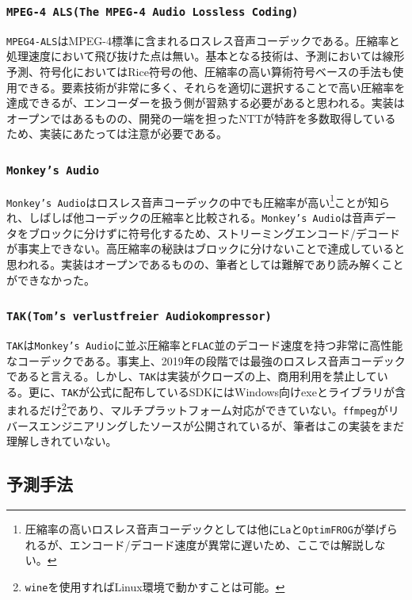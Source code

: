 \documentclass[uplatex,dvipdfmx,b5j,10pt]{jsbook}
\theoremstyle{definition}
\begin{document}
\subsubsection{\texttt{MPEG-4 ALS(The MPEG-4 Audio Lossless Coding)}}
\texttt{MPEG4-ALS}\cite{mpeg4als}はMPEG-4標準に含まれるロスレス音声コーデックである。圧縮率と処理速度において飛び抜けた点は無い。基本となる技術は、予測においては線形予測、符号化においてはRice符号の他、圧縮率の高い算術符号ベースの手法も使用できる。要素技術が非常に多く、それらを適切に選択することで高い圧縮率を達成できるが、エンコーダーを扱う側が習熟する必要があると思われる。実装はオープンではある\cite{mpeg4alsenc}ものの、開発の一端を担ったNTTが特許を多数取得しているため、実装にあたっては注意が必要である。

\subsubsection{\texttt{Monkey's Audio}}
\texttt{Monkey's Audio}\cite{monkeysaudio}はロスレス音声コーデックの中でも圧縮率が高い\footnote{圧縮率の高いロスレス音声コーデックとしては他に\texttt{La}\cite{la}と\texttt{OptimFROG}\cite{optimfrog}が挙げられるが、エンコード/デコード速度が異常に遅いため、ここでは解説しない。}ことが知られ、しばしば他コーデックの圧縮率と比較される。\texttt{Monkey's Audio}は音声データをブロックに分けずに符号化するため、ストリーミングエンコード/デコードが事実上できない。高圧縮率の秘訣はブロックに分けないことで達成していると思われる。実装はオープンであるものの、筆者としては難解であり読み解くことができなかった。

\subsubsection{\texttt{TAK(Tom's verlustfreier Audiokompressor)}}
\texttt{TAK}\cite{tak}は\texttt{Monkey's Audio}に並ぶ圧縮率と\texttt{FLAC}並のデコード速度を持つ非常に高性能なコーデックである。事実上、2019年の段階では最強のロスレス音声コーデックであると言える。しかし、\texttt{TAK}は実装がクローズの上、商用利用を禁止している。更に、\texttt{TAK}が公式に配布しているSDKにはWindows向けexeとライブラリが含まれるだけ\footnote{\texttt{wine}を使用すればLinux環境で動かすことは可能。}であり、マルチプラットフォーム対応ができていない。\texttt{ffmpeg}がリバースエンジニアリングしたソースが公開されている\cite{takdec}が、筆者はこの実装をまだ理解しきれていない。

\subsection{予測手法}
\end{document}
